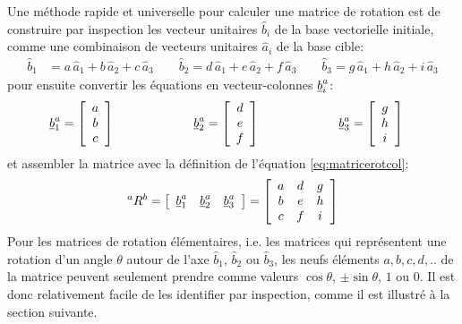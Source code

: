 Une méthode rapide et universelle pour calculer une matrice de rotation est de construire par inspection les vecteur unitaires $\hat{b}_i$ de la base vectorielle initiale, comme une combinaison de vecteurs unitaires $\hat{a}_i$ de la base cible:
\begin{align}
\hat{b}_1 &= a \, \hat{a}_1 + b \, \hat{a}_2 + c \, \hat{a}_3  \quad\quad  \hat{b}_2 = d \, \hat{a}_1 + e \, \hat{a}_2 + f \, \hat{a}_3   \quad\quad  \hat{b}_3 = g \, \hat{a}_1 + h \, \hat{a}_2 + i \, \hat{a}_3 
\end{align} 
pour ensuite convertir les équations en vecteur-colonnes $\underline{b}_i^a$:
\begin{align}
\underline{b}_1^a  &= \left[ \begin{array}{c} a \\ b \\ c  \end{array} \right] \quad\quad\quad\quad\quad\quad\;  
\underline{b}_2^a  = \left[ \begin{array}{c} d \\ e \\ f  \end{array} \right]  \quad\quad\quad\quad\quad\quad\; 
\underline{b}_3^a  = \left[ \begin{array}{c} g \\ h \\ i  \end{array} \right] 
\end{align} 
et assembler la matrice avec la définition de l'équation \eqref{eq:matricerotcol}:
\begin{align}
{}^aR^b = 
\left[ \begin{array}{c c c} 
\underline{b}_1^a &  \underline{b}_2^a & \underline{b}_3^a
\end{array} \right] 
=
\left[ \begin{array}{c c c} 
a & d & g \\ 
b & e & h \\ 
c & f & i 
\end{array} \right]
\end{align} 
Pour les matrices de rotation élémentaires, i.e. les matrices qui représentent une rotation d'un angle $\theta$ autour de l'axe $\hat{b}_1$, $\hat{b}_2$ ou $\hat{b}_3$, les neufs éléments $a,b,c,d,..$ de la matrice peuvent seulement prendre comme valeurs $\cos \theta$, $\pm \sin \theta$, $1$ ou $0$. Il est donc relativement facile de les identifier par inspection, comme il est illustré à la section suivante.


